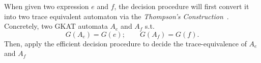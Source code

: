 When given two expression \(e\) and \(f\), the decision procedure will first convert it into two trace equivalent automaton via the \emph{Thompson's Construction}~\cite{Smolka_Foster_Hsu_Kappé_Kozen_Silva_2020}. Concretely, two GKAT automata \(A_e\) and \(A_f\) s.t.
\[G(A_e) = G(e); \qquad G(A_f) = G(f).\]
Then, apply the efficient decision procedure to decide the trace-equivalence of \(A_e\) and \(A_f\)



